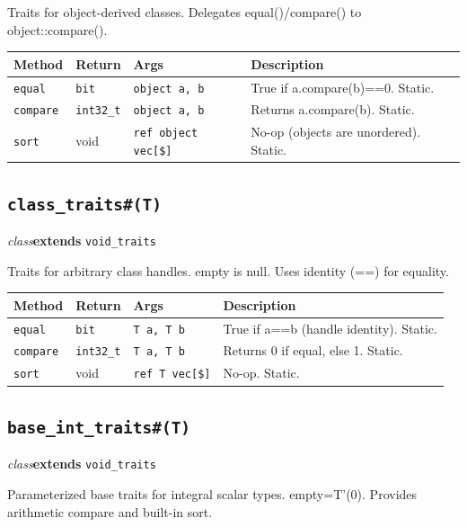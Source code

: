 \documentclass[11pt,letterpaper]{report}
\begin{document}
Traits for object-derived classes. Delegates equal()/compare() to object::compare().

\begin{xltabular}{\linewidth}{>{\small}p{1.35in} >{\small}p{1.25in} >{\small}p{0.95in} >{\small}X}
\toprule
\textbf{Method} & \textbf{Return} & \textbf{Args} & \textbf{Description} \\
\midrule
\endhead
\bottomrule
\endfoot
\texttt{equal} & \texttt{bit} & \texttt{object a, b} & True if a.compare(b)==0. Static. \\
\texttt{compare} & \texttt{int32\_t} & \texttt{object a, b} & Returns a.compare(b). Static. \\
\texttt{sort} & void & \texttt{ref object vec[\$]} & No-op (objects are unordered). Static. \\
\end{xltabular}

\subsection*{\texttt{class\_traits\#(T)}}
\noindent\small\textit{class}\quad \textbf{extends} \texttt{void\_traits}\par

Traits for arbitrary class handles. empty is null. Uses identity (==) for equality.

\begin{xltabular}{\linewidth}{>{\small}p{1.35in} >{\small}p{1.25in} >{\small}p{0.95in} >{\small}X}
\toprule
\textbf{Method} & \textbf{Return} & \textbf{Args} & \textbf{Description} \\
\midrule
\endhead
\bottomrule
\endfoot
\texttt{equal} & \texttt{bit} & \texttt{T a, T b} & True if a==b (handle identity). Static. \\
\texttt{compare} & \texttt{int32\_t} & \texttt{T a, T b} & Returns 0 if equal, else 1. Static. \\
\texttt{sort} & void & \texttt{ref T vec[\$]} & No-op. Static. \\
\end{xltabular}

\subsection*{\texttt{base\_int\_traits\#(T)}}
\noindent\small\textit{class}\quad \textbf{extends} \texttt{void\_traits}\par

Parameterized base traits for integral scalar types. empty=T'(0). Provides arithmetic compare and built-in sort.
\end{document}

